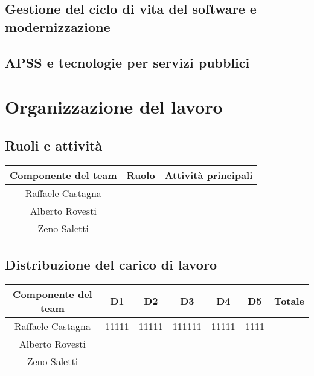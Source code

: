 \documentclass[11pt, a4paper]{article}
\theoremstyle{definition}
\begin{document}
\subsection{Gestione del ciclo di vita del software e modernizzazione}
\subsection{APSS e tecnologie per servizi pubblici}

\newpage
\section{Organizzazione del lavoro}
\subsection{Ruoli e attività}
\begin{center}
  \footnotesize
  \begin{tabularx}{\textwidth}{|c||c||X|}
      \hline
      \cellcolor{red!70}Componente del team & \cellcolor{red!70}Ruolo & \cellcolor{red!70}Attività principali\\
      \hline
      Raffaele Castagna & &\\
      \hline
      Alberto Rovesti & &\\
      \hline
      Zeno Saletti & &\\
      \hline
  \end{tabularx}
\end{center}

\subsection{Distribuzione del carico di lavoro}
\begin{center}
  \footnotesize
  \begin{tabularx}{\textwidth}{|c||c||c||c||c||c||X|}
      \hline
      \cellcolor{red!70}Componente del team & \cellcolor{red!70}D1 & \cellcolor{red!70}D2 & \cellcolor{red!70}D3 & \cellcolor{red!70}D4 & \cellcolor{red!70}D5 & \cellcolor{red!70}Totale\\
      \hline
      Raffaele Castagna & 11111&11111&111111&11111&1111&\\
      \hline
      Alberto Rovesti & &&&&&\\
      \hline
      Zeno Saletti & &&&&&\\
      \hline
  \end{tabularx}
\end{center}
\end{document}
